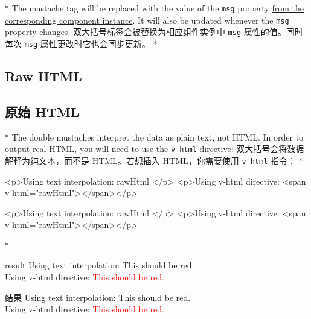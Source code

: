 \begin{paracol}{2}
\switchcolumn[0]*%
The mustache tag will be replaced with the value of the \texttt{msg}
property
\href{https://vuejs.org/guide/essentials/reactivity-fundamentals.html\#declaring-reactive-state}{from
the corresponding component instance}. It will also be updated whenever
the \texttt{msg} property changes.
\switchcolumn
双大括号标签会被替换为\href{https://cn.vuejs.org/guide/essentials/reactivity-fundamentals.html\#declaring-reactive-state}{相应组件实例中}
\texttt{msg} 属性的值。同时每次 \texttt{msg} 属性更改时它也会同步更新。
\switchcolumn[0]*%
\subsection{Raw HTML}
\switchcolumn
\subsection{原始 HTML}
\switchcolumn[0]*%
The double mustaches interpret the data as plain text, not HTML. In
order to output real HTML, you will need to use the
\href{https://vuejs.org/api/built-in-directives.html\#v-html}{\texttt{v-html}
directive}:
\switchcolumn
双大括号会将数据解释为纯文本，而不是 HTML。若想插入 HTML，你需要使用
\href{https://cn.vuejs.org/api/built-in-directives.html\#v-html}{\texttt{v-html}
指令}：
\switchcolumn[0]*%
\begin{codeHtml}
<p>Using text interpolation: {{ rawHtml }}</p>
<p>Using v-html directive: <span v-html="rawHtml"></span></p>
\end{codeHtml}  
\switchcolumn
\begin{codeHtml}
<p>Using text interpolation: {{ rawHtml }}</p>
<p>Using v-html directive: <span v-html="rawHtml"></span></p>
\end{codeHtml}  
\switchcolumn[0]*%
\begin{vueQuote}{result}
Using text interpolation: This should be red.\\
Using v-html directive: {\textcolor{red}{This should be red.}}
\end{vueQuote}
\switchcolumn
\begin{vueQuote}{结果}
Using text interpolation: This should be red.\\
Using v-html directive: {\textcolor{red}{This should be red.}}
\end{vueQuote}


\end{paracol}
